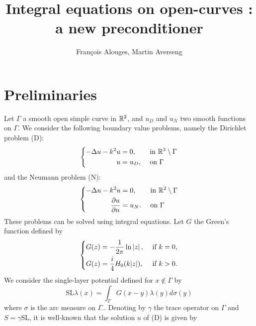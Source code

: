 \documentclass[]{article}
\author{François Alouges, Martin Averseng}
\title{Integral equations on open-curves : a new preconditioner}
\begin{document}
\maketitle




\section{Preliminaries}
Let $\Gamma$ a smooth open simple curve in $\mathbb{R}^2$, and $u_D$ and $u_N$ two smooth functions on $\Gamma$. We consider the following boundary value problems, namely the Dirichlet problem (D):  
\begin{equation*}
\left \{
\begin{aligned}
-\Delta u - k^2 u &= 0, && \text{ in } \mathbb{R}^2 \setminus \Gamma \\
u &= u_D, && \text{ on } \Gamma
\end{aligned} \right.
\end{equation*}
and the Neumann problem (N): 
\begin{equation*}
\left \{
\begin{aligned}
-\Delta u - k^2 u &= 0, && \text{ in } \mathbb{R}^2 \setminus \Gamma \\
\dfrac{\partial u}{\partial n} &= u_N. && \text{ on } \Gamma
\end{aligned} \right.
\end{equation*} 
These problems can be solved using integral equations. Let $G$ the Green's function defined by 
\begin{equation}
\left \{
\begin{aligned}
G(z) &= -\dfrac{1}{2\pi} \ln \left\lvert z \right\rvert, && \text{ if } k= 0,\\
G(z) &= \frac{i}{4}H_0(k|z|), && \text{ if } k > 0.
\end{aligned} \right.
\end{equation} 
We consider the single-layer potential defined for $x \notin \Gamma$ by 
\begin{equation}
	\text{SL}\lambda(x) = \int_{\Gamma}G(x-y)\lambda(y)d\sigma(y)
\end{equation}
where $\sigma$ is the arc measure on $\Gamma$.. Denoting by $\gamma$ the trace operator on $\Gamma$ and $S = \gamma \text{SL}$, it is well-known that the solution $u$ of (D) is given by 
\end{document}
